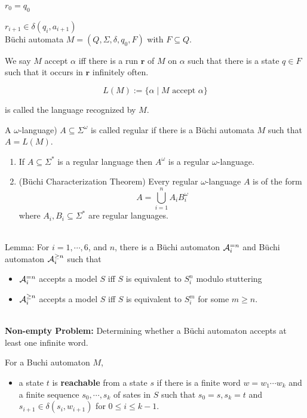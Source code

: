 \documentclass[12pt]{article}
\begin{document}
\begin{CJK*}{GBK}{song}
$r_0=q_0$

$r_{i+1}\in \delta(q_i,a_{i+1})$
\ \\


B\"{u}chi automata $M=(Q,\Sigma,\delta, q_0, F)$ with $F\subseteq Q$.

We say $M$ accept $\alpha$  iff there is a run $\mathbf{r}$ of $M$ on $\alpha$ such that there is a state $q\in F$ such that it occurs in $\mathbf{r}$ infinitely often.

$$L(M):=\{\alpha\mid M \mbox{ accept } \alpha\}$$

is called the language recognized by $M$.

A $\omega$-language) $A\subseteq \Sigma^{\omega}$ is called regular if there is a B\"{u}chi automata $M$ such that $A=L(M)$.



\begin{enumerate}
\item If $A\subseteq\Sigma^*$ is a regular language then $A^{\omega}$ is a regular $\omega$-language.

\item (B\"{u}chi Characterization Theorem) Every regular $\omega$-language $A$ is of the form $$A=\bigcup_{i=1}^nA_iB_i^{\omega}$$
where $A_i, B_i\subseteq \Sigma^*$ are regular languages.
\end{enumerate}
\ \\

Lemma: For $i=1,\cdots,6$, and $n$, there is a B\"{u}chi automaton ${\cal A}_i^{=n}$ and B\"{u}chi automaton ${\cal A}^{\geq n}_i$ such that
\begin{itemize}
\item ${\cal A}_i^{=n}$ accepts a model $S$ iff $S$ is equivalent to $S^n_i$ modulo stuttering
\item ${\cal A}^{\geq n}_i$ accepts a model $S$ iff $S$ is equivalent to $S^m_i$ for some $m\geq n$.
\end{itemize}
\ \\

{\bf Non-empty Problem:} Determining whether a B\"{u}chi automaton accepts at least one infinite word.

For a Buchi automaton $M$, 
\begin{itemize}
\item a state $t$ is {\bf reachable} from a state $s$ if there is a finite word $w=w_1\cdots w_k$ and a finite sequence $s_0,\cdots, s_k$ of sates in $S$ such that $s_0=s, s_k=t$ and $s_{i+1}\in \delta(s_i,w_{i+1})$ for $0\leq i\leq k-1$.  
    

\end{itemize}
\end{CJK*}
\end{document}
